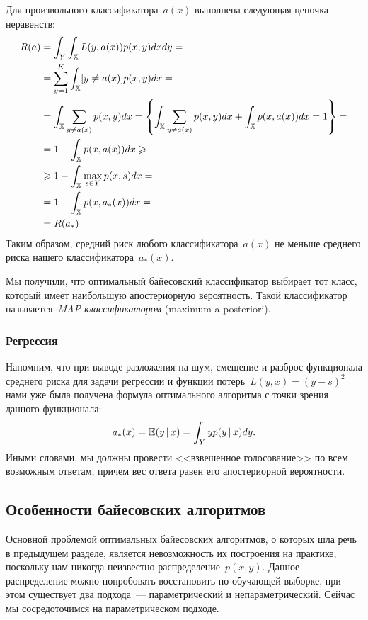 \documentclass[12pt,fleqn]{article}
\begin{document}
Для произвольного классификатора~$a(x)$ выполнена
следующая цепочка неравенств:
\begin{align*}
    R(a)
    &=
    \int_{Y} \int_{\mathbb{X}} L(y, a(x)) p(x, y) dx dy
    =
    \\
    &=
    \sum_{y = 1}^{K} \int_{\mathbb{X}} [y \neq a(x)] p(x, y) dx
    =
    \\
    &=
    \int_{\mathbb{X}} \sum_{y \neq a(x)} p(x, y) dx
    =
    \left\{
    \int_{\mathbb{X}} \sum_{y \neq a(x)} p(x, y) dx
    +
    \int_{\mathbb{X}} p(x, a(x)) dx
    =
    1
    \right\}
    =
    \\
    &=
    1 - \int_{\mathbb{X}} p(x, a(x)) dx
    \geqslant\\
    &\geqslant
    1 - \int_{\mathbb{X}} \max_{s \in Y} p(x, s) dx
    =
    \\
    &=
    1 - \int_{\mathbb{X}} p(x, a_*(x)) dx
    =
    \\
    &=
    R(a_*)
\end{align*}
Таким образом, средний риск любого классификатора~$a(x)$
не меньше среднего риска нашего классификатора~$a_*(x)$.

Мы получили, что оптимальный байесовский классификатор
выбирает тот класс, который имеет наибольшую апостериорную вероятность.
Такой классификатор называется~\emph{MAP-классификатором} (maximum a posteriori).

\subsubsection{Регрессия}

Напомним, что при выводе разложения на шум, смещение и разброс функционала среднего риска для задачи регрессии и функции потерь~$L(y, x) = (y - s)^2$ нами уже была получена формула оптимального алгоритма с точки зрения данного функционала:
\[
    a_*(x) = \mathbb{E} (y \mspace{3mu}{|}\mspace{3mu} x)
    =
    \int_Y y p(y \mspace{3mu}{|}\mspace{3mu} x) dy.
\]
Иными словами, мы должны провести <<взвешенное голосование>>
по всем возможным ответам, причем вес ответа равен его
апостериорной вероятности.

\subsection{Особенности байесовских алгоритмов}
Основной проблемой оптимальных байесовских алгоритмов,
о которых шла речь в предыдущем разделе, является
невозможность их построения на практике, поскольку нам никогда
неизвестно распределение~$p(x, y)$.
Данное распределение можно попробовать восстановить по обучающей выборке,
при этом существует два подхода~--- параметрический и непараметрический.
Сейчас мы сосредоточимся на параметрическом подходе.
\end{document}
